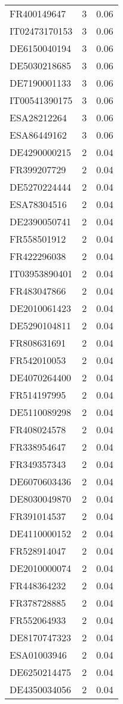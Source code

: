 \begin{table*}[htbp]
\begin{tabular}{lrr}
FR400149647 & 3 & 0.06 \\
IT02473170153 & 3 & 0.06 \\
DE6150040194 & 3 & 0.06 \\
DE5030218685 & 3 & 0.06 \\
DE7190001133 & 3 & 0.06 \\
IT00541390175 & 3 & 0.06 \\
ESA28212264 & 3 & 0.06 \\
ESA86449162 & 3 & 0.06 \\
DE4290000215 & 2 & 0.04 \\
FR399207729 & 2 & 0.04 \\
DE5270224444 & 2 & 0.04 \\
ESA78304516 & 2 & 0.04 \\
DE2390050741 & 2 & 0.04 \\
FR558501912 & 2 & 0.04 \\
FR422296038 & 2 & 0.04 \\
IT03953890401 & 2 & 0.04 \\
FR483047866 & 2 & 0.04 \\
DE2010061423 & 2 & 0.04 \\
DE5290104811 & 2 & 0.04 \\
FR808631691 & 2 & 0.04 \\
FR542010053 & 2 & 0.04 \\
DE4070264400 & 2 & 0.04 \\
FR514197995 & 2 & 0.04 \\
DE5110089298 & 2 & 0.04 \\
FR408024578 & 2 & 0.04 \\
FR338954647 & 2 & 0.04 \\
FR349357343 & 2 & 0.04 \\
DE6070603436 & 2 & 0.04 \\
DE8030049870 & 2 & 0.04 \\
FR391014537 & 2 & 0.04 \\
DE4110000152 & 2 & 0.04 \\
FR528914047 & 2 & 0.04 \\
DE2010000074 & 2 & 0.04 \\
FR448364232 & 2 & 0.04 \\
FR378728885 & 2 & 0.04 \\
FR552064933 & 2 & 0.04 \\
DE8170747323 & 2 & 0.04 \\
ESA01003946 & 2 & 0.04 \\
DE6250214475 & 2 & 0.04 \\
DE4350034056 & 2 & 0.04 \\

\end{tabular}
\end{table*}
